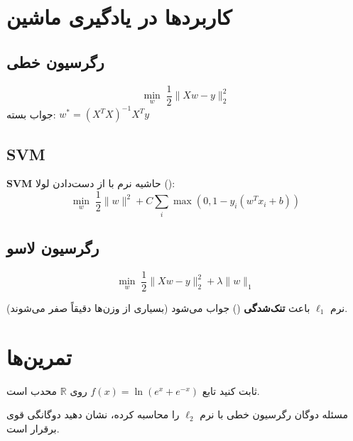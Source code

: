 \documentclass{matinbook}
\begin{document}
    \section{کاربردها در یادگیری ماشین}
    
    \subsection{رگرسیون خطی}
    
    \[
    \min_{w} \; \frac{1}{2}\|Xw - y\|_{2}^{2}
    \]
    جواب بسته: $w^{*} = (X^{T}X)^{-1}X^{T}y$
    
    \subsection{SVM}
    
    \begin{definition}
        \textbf{SVM} حاشیه نرم
        با از دست‌دادن لولا ():
        \[
        \min_{w} \; \frac{1}{2}\|w\|^{2} +
        C \sum_{i} \max(0, 1 - y_{i}(w^{T}x_{i} + b))
        \]
        \label{def:svm}
    \end{definition}
    
    \subsection{رگرسیون لاسو}
    
    \[
    \min_{w} \; \frac{1}{2}\|Xw - y\|_{2}^{2} +
    \lambda \|w\|_{1}
    \]
    
    نرم $\ell_{1}$ باعث \textbf{تنک‌شدگی}
    () جواب می‌شود
    (بسیاری از وزن‌ها دقیقاً صفر می‌شوند).
    
    \section{تمرین‌ها}
    
    \begin{exercise}
        ثابت کنید تابع $f(x) = \ln(e^{x} + e^{-x})$
        روی $\mathbb{R}$ محدب است.
        \label{exc:log-cosh-convex}
    \end{exercise}
    
    \begin{exercise}
        مسئله دوگان رگرسیون خطی با نرم $\ell_{2}$
        را محاسبه کرده، نشان دهید
        دوگانگی قوی برقرار است.
        \label{exc:ridge-dual}
    \end{exercise}
    
\end{document}
